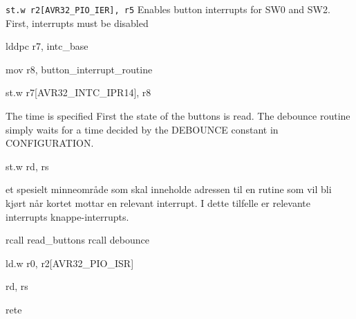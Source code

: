 \texttt{st.w r2[AVR32_PIO_IER], r5}
Enables button interrupts for SW0 and SW2.
First, interrupts must be disabled


lddpc r7, intc_base

mov r8, button_interrupt_routine

st.w r7[AVR32_INTC_IPR14], r8

The time is specified 
First the state of the buttons is read.
The debounce routine simply waits for a time decided by the DEBOUNCE constant in CONFIGURATION.

st.w rd, rs


et spesielt minneområde som skal inneholde adressen til en rutine som vil bli kjørt når kortet mottar en relevant interrupt. I dette tilfelle er relevante interrupts knappe-interrupts.

rcall read_buttons
rcall debounce

ld.w r0, r2[AVR32_PIO_ISR]

rd, rs

rete